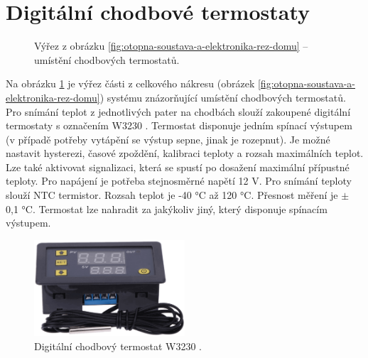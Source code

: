 \section{Digitální chodbové termostaty}
\label{sec:digitalni-chodbove-termostaty}
\begin{figure}[H]
   \centering
   \def\svgwidth{0.4\columnwidth}
   
    \caption[Výřez pro umístění chodbových termostatů.]{Výřez z obrázku \ref{fig:otopna-soustava-a-elektronika-rez-domu} – umístění chodbových termostatů.}
    \label{fig:vyrez-lokalni-termostaty}
\end{figure}

Na obrázku \ref{fig:vyrez-lokalni-termostaty} je výřez části z celkového nákresu (obrázek \ref{fig:otopna-soustava-a-elektronika-rez-domu}) systému znázorňující umístění chodbových termostatů. Pro snímání teplot z jednotlivých pater na chodbách slouží zakoupené digitální termostaty s označením W3230 \cite{digitalni-termostat-w3230}. Termostat disponuje jedním spínací výstupem (v případě potřeby vytápění se výstup sepne, jinak je rozepnut). Je možné nastavit hysterezi, časové zpoždění, kalibraci teploty a rozsah maximálních teplot. Lze také aktivovat signalizaci, která se spustí po dosažení maximální přípustné teploty. Pro napájení je potřeba stejnosměrné napětí 12 V. Pro snímání teploty slouží NTC termistor. Rozsah teplot je -40 °C až 120 °C. Přesnost měření je $\pm$ 0,1 °C. Termostat lze nahradit za jakýkoliv jiný, který disponuje spínacím výstupem.


\begin{figure}[H]
    \centering
    \includegraphics[width=0.5\textwidth]{images/digitalni-termostat-w3230.png}
    \caption[Digitální chodbový termostat W3230.]{Digitální chodbový termostat W3230 \cite{digitalni-termostat-w3230}.}
    \label{fig:digitalni-termostat-w3230}
\end{figure}